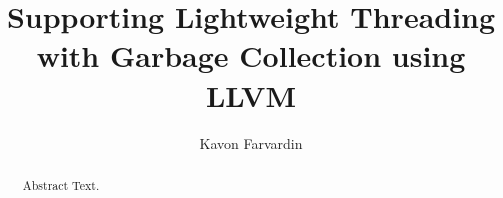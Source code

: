 \documentclass[sigplan, anonymous, review, nonacm]{acmart}
\begin{document}
\title{Supporting Lightweight Threading with Garbage Collection using LLVM}

\author{Kavon Farvardin}




\begin{abstract}
Abstract Text.
\end{abstract}



\maketitle



% 
% 
\end{document}
